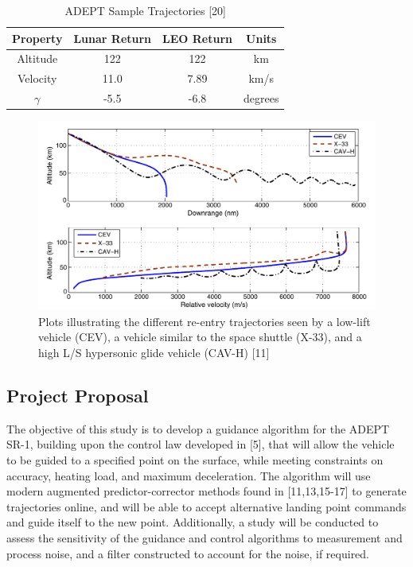\documentclass[12pt]{article}
\numberwithin{equation}{section}
\numberwithin{figure}{section}
\numberwithin{table}{section}
\begin{document}
\begin{table}
\begin{center}
\caption{ADEPT Sample Trajectories [20]}
\begin{tabular}{|c|c|c|c|}
\hline
\textbf{Property} & \textbf{Lunar Return} & \textbf{LEO Return} &  \textbf{Units}\\
\hline
Altitude & 122 & 122 & km\\
\hline
Velocity & 11.0 & 7.89 & km/s\\
\hline
$\gamma$ & -5.5 & -6.8 & degrees\\
\hline
\end{tabular}
\end{center}
\end{table}

\begin{figure}[h]
  \centering
  \includegraphics[width=1\textwidth]{Figures/different entry trajectories 11.png}
  \caption{Plots illustrating the different re-entry trajectories seen by a low-lift vehicle (CEV), a vehicle similar to the space shuttle (X-33), and a high L/S hypersonic glide vehicle (CAV-H) [11]}
  \label{fig:Reentry_Profiles}
\end{figure}

\subsection{Project Proposal}
The objective of this study is to develop a guidance algorithm for the ADEPT SR-1, building upon the control law developed in [5], that will allow the vehicle to be guided to a specified point on the surface, while meeting constraints on accuracy, heating load, and maximum deceleration. The algorithm will use modern augmented predictor-corrector methods found in [11,13,15-17] to generate trajectories online, and will be able to accept alternative landing point commands and guide itself to the new point. Additionally, a study will be conducted to assess the sensitivity of the guidance and control algorithms to measurement and process noise, and a filter constructed to account for the noise, if required.
\end{document}
